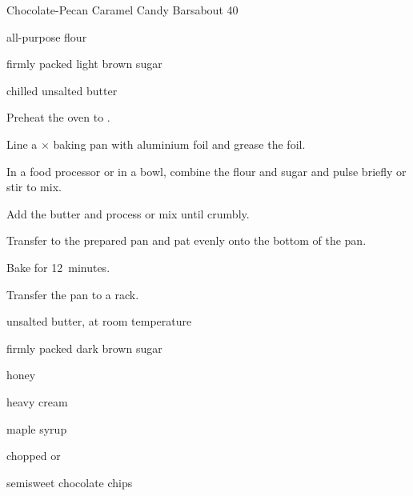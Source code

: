 \begin{recipe}{Chocolate-Pecan Caramel Candy Bars}{}{about 40}


\begin{ingredients}
\item \C{1 \half} all-purpose flour
\item \C{\half} firmly packed light brown sugar
\item \C{\half} chilled unsalted butter
\end{ingredients}

\begin{directions}
\item Preheat the oven to .
\item Line a $\times$ baking pan with aluminium foil and grease the foil.
\item In a food processor or in a bowl, combine the flour and sugar and pulse briefly or stir to mix.
\item Add the butter and process or mix until crumbly.
\item Transfer to the prepared pan and pat evenly onto the bottom of the pan.
\item Bake for 12~minutes.
\item Transfer the pan to a rack.
\end{directions}


\begin{ingredients}
\item {} unsalted butter, at room temperature
\item {} firmly packed dark brown sugar
\item {} honey
\item {} heavy cream
\item {} maple syrup
\item \C{1 \half} chopped  or 
\item \C{\half} semisweet chocolate chips
\end{ingredients}


\end{recipe}
